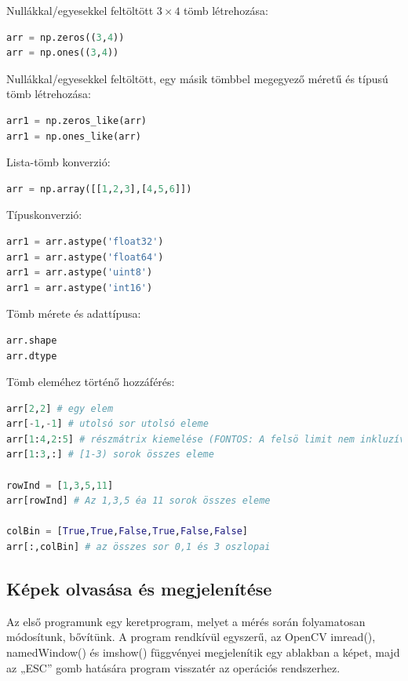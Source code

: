 \documentclass[12pt,a4paper,oneside]{report}             %
\begin{document}
Nullákkal/egyesekkel feltöltött $3\times 4$ tömb létrehozása:

\begin{lstlisting}[language=Python]
arr = np.zeros((3,4))
arr = np.ones((3,4))
\end{lstlisting}

Nullákkal/egyesekkel feltöltött, egy másik tömbbel megegyező méretű és típusú tömb létrehozása:

\begin{lstlisting}[language=Python]
arr1 = np.zeros_like(arr)
arr1 = np.ones_like(arr)
\end{lstlisting}

Lista-tömb konverzió:

\begin{lstlisting}[language=Python]
arr = np.array([[1,2,3],[4,5,6]])
\end{lstlisting}

Típuskonverzió:

\begin{lstlisting}[language=Python]
arr1 = arr.astype('float32')
arr1 = arr.astype('float64')
arr1 = arr.astype('uint8')
arr1 = arr.astype('int16')
\end{lstlisting}

Tömb mérete és adattípusa:

\begin{lstlisting}[language=Python]
arr.shape
arr.dtype
\end{lstlisting}

Tömb eleméhez történő hozzáférés:

\begin{lstlisting}[language=Python]
arr[2,2] # egy elem
arr[-1,-1] # utolsó sor utolsó eleme
arr[1:4,2:5] # részmátrix kiemelése (FONTOS: A felsö limit nem inkluzív, vagyis az [1-4) sor és a [2-5) oszlop vannak benne)
arr[1:3,:] # [1-3) sorok összes eleme 

rowInd = [1,3,5,11]
arr[rowInd] # Az 1,3,5 éa 11 sorok összes eleme

colBin = [True,True,False,True,False,False]
arr[:,colBin] # az összes sor 0,1 és 3 oszlopai
\end{lstlisting}

\subsection{Képek olvasása és megjelenítése}

Az első programunk egy keretprogram, melyet a mérés során folyamatosan módosítunk, bővítünk. A program rendkívül egyszerű, az OpenCV imread(), namedWindow() és imshow() függvényei megjelenítik egy ablakban a képet, majd az „ESC” gomb hatására program visszatér az operációs rendszerhez.
\end{document}

